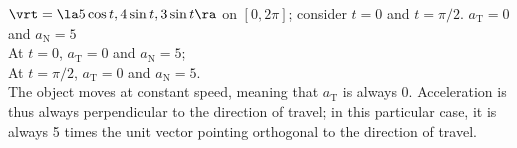 {$\vrt = \la 5\cos t,4\sin t, 3\sin t \ra$ on $[0,2\pi]$; consider $t=0$ and $t=\pi/2$.
}
{$a_{\text{T}} = 0$ and $a_{\text{N}} = 5$\\
At $t=0$, $a_{\text{T}} = 0$ and $a_{\text{N}} = 5$;\\
At $t=\pi/2$, $a_{\text{T}} = 0$ and $a_{\text{N}} = 5$.\\
The object moves at constant speed, meaning that $a_{\text{T}}$ is always 0. Acceleration is thus always perpendicular to the direction of travel; in this particular case, it is always 5 times the unit vector pointing orthogonal to the direction of travel.
}